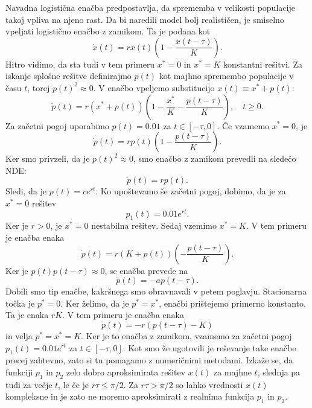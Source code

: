 \documentclass[12pt,a4paper]{amsart}
\theoremstyle{definition} %
\theoremstyle{plain} %
\begin{document}
Navadna logistična enačba predpostavlja, da sprememba v velikosti populacije takoj vpliva na njeno rast. Da bi naredili 
model bolj realističen, je smiselno vpeljati logistično enačbo z zamikom. Ta je podana kot 
\[\dot{x}(t)=rx(t)\left(1-\frac{x(t-\tau)}{K}\right).\]
Hitro vidimo, da sta tudi v tem primeru $x^*=0$ in $x^*=K$ konstantni rešitvi. Za iskanje splošne rešitve definirajmo 
$p(t)$ kot majhno spremembo populacije v času $t$, torej $p(t)^2\approx0$. V enačbo vpeljemo substitucijo $x(t)\equiv x^*+p(t)$:
\[\dot{p}(t)=r(x^*+p(t))\left(1-\frac{x^*}{K}-\frac{p(t-\tau)}{K}\right), \quad t\geq0.\]
Za začetni pogoj uporabimo $p(t)=0.01$ za $t\in[-\tau,0]$.
Če vzamemo $x^*=0$, je 
\[\dot{p}(t)=rp(t)\left(1-\frac{p(t-\tau)}{K}\right).\]
Ker smo privzeli, da je $p(t)^2\approx0$, smo enačbo z zamikom prevedli na sledečo NDE:
\[\dot{p}(t)=rp(t).\]
Sledi, da je $p(t)=ce^{rt}$. Ko upoštevamo še začetni pogoj, dobimo, da je za $x^*=0$ rešitev 
\[p_1(t)=0.01e^{rt}.\] 
Ker je $r>0$, je $x^*=0$ nestabilna rešitev.
Sedaj vzemimo $x^*=K$. V tem primeru je enačba enaka 
\[\dot{p}(t)=r(K+p(t))\left(-\frac{p(t-\tau)}{K}\right).\]
Ker je $p(t)p(t-\tau)\approx0$, se enačba prevede na 
\[\dot{p}(t)=-ap(t-\tau).\]
Dobili smo tip enačbe, kakršnega smo obravnavali v petem poglavju. Stacionarna točka je $p^*=0$. Ker želimo, da 
je $p^*=x^*$, enačbi prištejemo primerno konstanto. Ta je enaka $rK$. V tem primeru je enačba enaka 
\[\dot{p}(t)=-r(p(t-\tau)-K)\]
in velja $p^*=x^*=K$. Ker je to enačba z zamikom, vzamemo za začetni pogoj $p_1(t)=0.01e^{rt}$ za $t\in[-\tau,0]$.
Kot smo že ugotovili je reševanje take enačbe precej zahtevno, zato si tu pomagamo z numeričnimi metodami. Izkaže se, da 
funkciji $p_1$ in $p_2$ zelo dobro aproksimirata rešitev $x(t)$ za majhne $t$, slednja pa tudi za večje $t$, le če 
je $r\tau \leq \pi/2$. Za $r\tau>\pi/2$ so lahko vrednosti $x(t)$ kompleksne in je zato ne moremo aproksimirati z 
realnima funkcija $p_1$ in $p_2$. 


\newpage
\overfullrule=0mm\printbibliography
\end{document}
